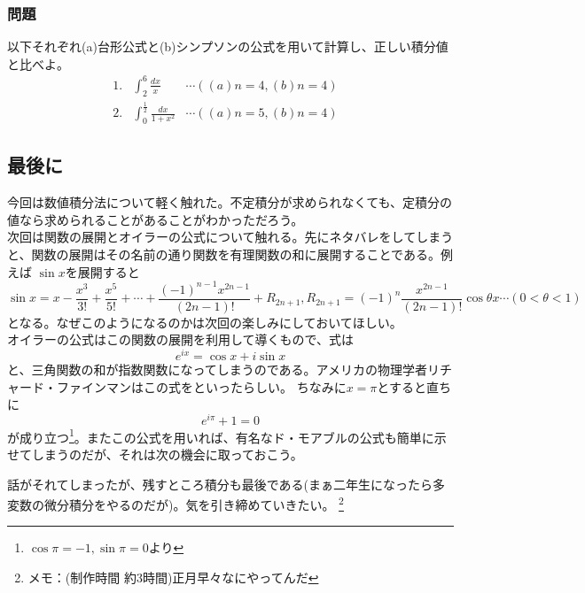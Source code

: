 \documentclass[a4j,dvipdfmx]{jsarticle}
\begin{document}
\subsubsection*{問題}
以下それぞれ(a)台形公式と(b)シンプソンの公式を用いて計算し、正しい積分値と比べよ。
\begin{align*}
    1.&\int_2^6\frac{dx}{x} &\cdots((a)n=4,(b)n=4)& \\
    2.&\int_0^{\frac{1}{2}}\frac{dx}{1+x^2} &\cdots((a)n=5,(b)n=4)&
\end{align*}
\newpage
\subsection*{最後に}
今回は数値積分法について軽く触れた。不定積分が求められなくても、定積分の値なら求められることがあることがわかっただろう。\\

次回は関数の展開とオイラーの公式について触れる。先にネタバレをしてしまうと、関数の展開はその名前の通り関数を有理関数の和に展開することである。例えば
$\sin x$を展開すると
\begin{equation*}
    \sin x=x-\frac{x^3}{3!}+\frac{x^5}{5!}+\cdots+\frac{(-1)^{n-1}x^{2n-1}}{(2n-1)!}+R_{2n+1},R_{2n+1}=(-1)^n\frac{x^{2n-1}}{(2n-1)!}\cos\theta x\cdots(0<\theta<1)
\end{equation*}
となる。なぜこのようになるのかは次回の楽しみにしておいてほしい。\\
オイラーの公式はこの関数の展開を利用して導くもので、式は
\begin{equation*}
    e^{ix}=\cos x+i\sin x
\end{equation*}
と、三角関数の和が指数関数になってしまうのである。アメリカの物理学者リチャード・ファインマンはこの式をといったらしい。
ちなみに$x=\pi$とすると直ちに
\begin{equation*}
    e^{i\pi}+1=0
\end{equation*}
が成り立つ\footnote{$\cos \pi=-1,\sin \pi=0$より}。またこの公式を用いれば、有名なド・モアブルの公式も簡単に示せてしまうのだが、それは次の機会に取っておこう。

話がそれてしまったが、残すところ積分も最後である(まぁ二年生になったら多変数の微分積分をやるのだが)。気を引き締めていきたい。
\footnote{メモ：(制作時間 約3時間)正月早々なにやってんだ}
\end{document}

